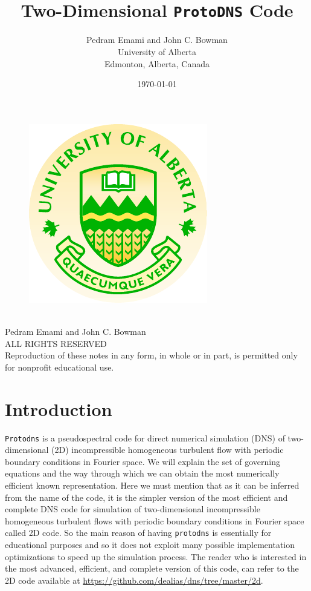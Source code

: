 \documentclass[12pt]{article}
\title{\huge{\textbf{\\Two-Dimensional {\tt ProtoDNS} Code}}}
\author{Pedram Emami and John C. Bowman\\University of Alberta\\Edmonton,
  Alberta, Canada}
\date{\today}
\begin{document}
\maketitle

\thispagestyle{empty}
\begin{figure}[h]
\centering
\includegraphics{uofa}
\end{figure}
\newpage
\thispagestyle{empty}
\begin{center}
\ \vspace{20cm}\\
Pedram Emami and John C. Bowman\\
ALL RIGHTS RESERVED\\
Reproduction of these notes in any form, in whole or in part, is permitted only for nonprofit educational use.
\end{center}
\newpage

\section{Introduction}
{\tt Protodns} is a pseudospectral code for
direct numerical simulation (DNS) of two-dimensional (2D) incompressible homogeneous
  turbulent flow with periodic boundary conditions in Fourier space. We
  will explain the set of governing equations and the way through which we
  can obtain the most numerically efficient known representation.
Here we must mention that as it can be inferred from the name of the code, it is the simpler version of the most efficient and complete DNS code for simulation of two-dimensional incompressible homogeneous turbulent flows with periodic boundary conditions in Fourier space called 2D code. So the main reason of having {\tt protodns} is essentially for educational purposes and so it does not exploit many possible implementation optimizations to speed up the simulation process. The reader who is interested in the most advanced, efficient, and complete version of this code, can refer to the 2D code available at \url{https://github.com/dealias/dns/tree/master/2d}.
%
\end{document}
